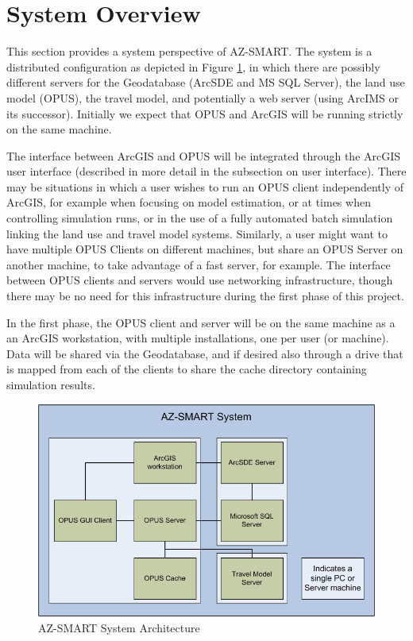 \section{System Overview}
This section provides a system perspective of AZ-SMART.  The system is a distributed configuration as depicted in Figure \ref{figSystem},
in which there are possibly different servers for the Geodatabase (ArcSDE and MS SQL Server), the land use model (OPUS), the travel model,
and potentially a web server (using ArcIMS or its successor).  Initially we expect that OPUS and ArcGIS will be running strictly on the
same machine.

The interface between ArcGIS and OPUS will be integrated through the ArcGIS user interface (described in more detail in the subsection on
user interface).  There may be situations in which a user wishes to run an OPUS client independently of ArcGIS, for example when focusing
on model estimation, or at times when controlling simulation runs, or in the use of a fully automated batch simulation linking the land
use and travel model systems.  Similarly, a user might want to have multiple OPUS Clients on different machines, but share an OPUS Server
on another machine, to take advantage of a fast server, for example.  The interface between OPUS clients and servers would use networking
infrastructure, though there may be no need for this infrastructure during the first phase of this project.

In the first phase, the OPUS client and server will be on the same machine as a an ArcGIS workstation, with multiple installations, one
per user (or machine).  Data will be shared via the Geodatabase, and if desired also through a drive that is mapped from each of the
clients to share the cache directory containing simulation results.

\begin{figure}[h]
\begin{center}
\includegraphics[scale=0.6]{figures/AZ-SMART_system_diagram.png}
\caption{AZ-SMART System Architecture}
\label{figSystem}
\end{center}
\end{figure}

